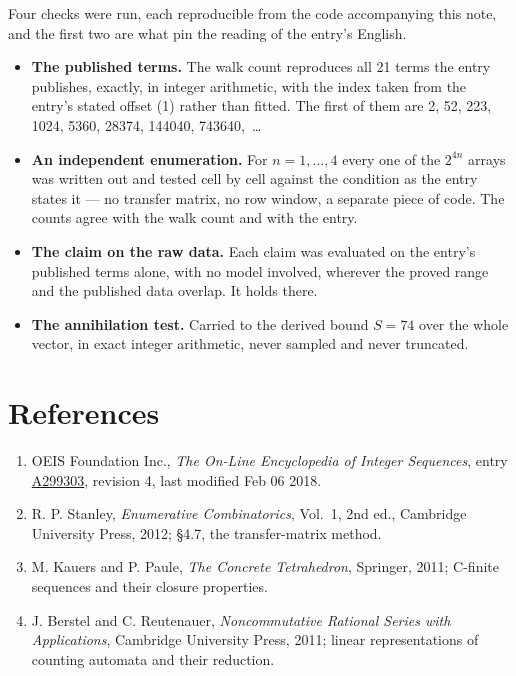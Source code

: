 \documentclass[11pt]{article}
\theoremstyle{definition}
\begin{document}
Four checks were run, each reproducible from the code accompanying this note, and the first two are what pin the reading of the entry's English.

\begin{itemize}

\item {\bfseries The published terms.} The walk count reproduces all 21 terms the entry publishes, exactly, in integer arithmetic, with the index taken from the entry's stated offset (1) rather than fitted. The first of them are 2, 52, 223, 1024, 5360, 28374, 144040, 743640,~\dots

\item {\bfseries An independent enumeration.} For $n = 1,\dots,4$ every one of the $2^{4n}$ arrays was written out and tested cell by cell against the condition as the entry states it --- no transfer matrix, no row window, a separate piece of code. The counts agree with the walk count and with the entry.

\item {\bfseries The claim on the raw data.} Each claim was evaluated on the entry's published terms alone, with no model involved, wherever the proved range and the published data overlap. It holds there.

\item {\bfseries The annihilation test.} Carried to the derived bound $S = 74$ over the whole vector, in exact integer arithmetic, never sampled and never truncated.

\end{itemize}

\section{References}

\begin{enumerate}

\item OEIS Foundation Inc., \emph{The On-Line Encyclopedia of Integer Sequences}, entry \href{https://oeis.org/A299303}{A299303}, revision 4, last modified Feb 06 2018.

\item R. P. Stanley, \emph{Enumerative Combinatorics}, Vol.~1, 2nd ed., Cambridge University Press, 2012; \S4.7, the transfer-matrix method.

\item M. Kauers and P. Paule, \emph{The Concrete Tetrahedron}, Springer, 2011; C-finite sequences and their closure properties.

\item J. Berstel and C. Reutenauer, \emph{Noncommutative Rational Series with Applications}, Cambridge University Press, 2011; linear representations of counting automata and their reduction.

\end{enumerate}
\end{document}
